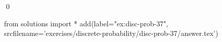 
\begin{ex} 
  \label{ex:disc-prob-37}
  
  \qed
\end{ex} 
\begin{python0}
from solutions import *
add(label="ex:disc-prob-37",
    srcfilename='exercises/discrete-probability/disc-prob-37/answer.tex') 
\end{python0}
